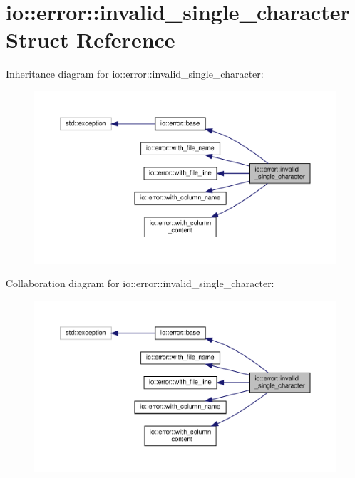 \hypertarget{structio_1_1error_1_1invalid__single__character}{}\section{io\+:\+:error\+:\+:invalid\+\_\+single\+\_\+character Struct Reference}
\label{structio_1_1error_1_1invalid__single__character}


Inheritance diagram for io\+:\+:error\+:\+:invalid\+\_\+single\+\_\+character\+:\nopagebreak
\begin{figure}[H]
\begin{center}
\leavevmode
\includegraphics[width=350pt]{structio_1_1error_1_1invalid__single__character__inherit__graph}
\end{center}
\end{figure}


Collaboration diagram for io\+:\+:error\+:\+:invalid\+\_\+single\+\_\+character\+:\nopagebreak
\begin{figure}[H]
\begin{center}
\leavevmode
\includegraphics[width=350pt]{structio_1_1error_1_1invalid__single__character__coll__graph}
\end{center}
\end{figure}

